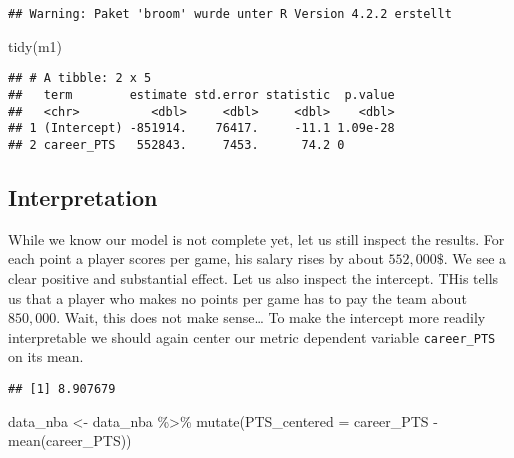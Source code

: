 \documentclass[
]{book}
\newenvironment{Shaded}{\begin{snugshade}}{\end{snugshade}}
\newcommand{\AttributeTok}[1]{\textcolor[rgb]{0.77,0.63,0.00}{#1}}
\newcommand{\FunctionTok}[1]{\textcolor[rgb]{0.00,0.00,0.00}{#1}}
\newcommand{\NormalTok}[1]{#1}
\newcommand{\OtherTok}[1]{\textcolor[rgb]{0.56,0.35,0.01}{#1}}
\newcommand{\SpecialCharTok}[1]{\textcolor[rgb]{0.00,0.00,0.00}{#1}}
\begin{document}
\begin{verbatim}
## Warning: Paket 'broom' wurde unter R Version 4.2.2 erstellt
\end{verbatim}

\begin{Shaded}
\begin{Highlighting}[]
\FunctionTok{tidy}\NormalTok{(m1)}
\end{Highlighting}
\end{Shaded}

\begin{verbatim}
## # A tibble: 2 x 5
##   term        estimate std.error statistic  p.value
##   <chr>          <dbl>     <dbl>     <dbl>    <dbl>
## 1 (Intercept) -851914.    76417.     -11.1 1.09e-28
## 2 career_PTS   552843.     7453.      74.2 0
\end{verbatim}

\hypertarget{interpretation-1}{%
\subsection{Interpretation}\label{interpretation-1}}

While we know our model is not complete yet, let us still inspect the results.
For each point a player scores per game, his salary rises by about \(552,000\$\).
We see a clear positive and substantial effect. Let us also inspect the
intercept. THis tells us that a player who makes no points per game has to pay
the team about \(850,000\). Wait, this does not make sense\ldots{}
To make the intercept more readily interpretable we should again center our
metric dependent variable \texttt{career\_PTS} on its mean.

\begin{Shaded}
\end{Shaded}

\begin{verbatim}
## [1] 8.907679
\end{verbatim}

\begin{Shaded}
\begin{Highlighting}[]
\NormalTok{data\_nba }\OtherTok{\textless{}{-}}\NormalTok{ data\_nba }\SpecialCharTok{\%\textgreater{}\%} 
  \FunctionTok{mutate}\NormalTok{(}\AttributeTok{PTS\_centered =}\NormalTok{ career\_PTS }\SpecialCharTok{{-}} \FunctionTok{mean}\NormalTok{(career\_PTS))}
\end{Highlighting}
\end{Shaded}
\end{document}
